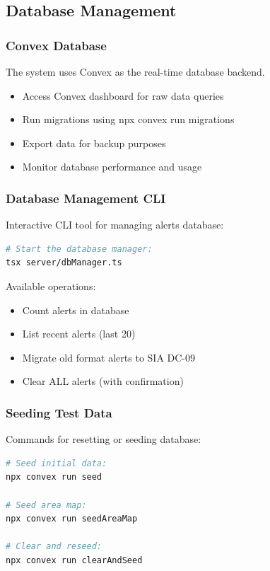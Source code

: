 \documentclass[12pt,a4paper]{article}
\begin{document}
\subsection{Database Management}

\subsubsection{Convex Database}
The system uses Convex as the real-time database backend.
\begin{itemize}
\item Access Convex dashboard for raw data queries
\item Run migrations using npx convex run migrations
\item Export data for backup purposes
\item Monitor database performance and usage
\end{itemize}

\subsubsection{Database Management CLI}
Interactive CLI tool for managing alerts database:

\begin{lstlisting}[language=bash]
# Start the database manager:
tsx server/dbManager.ts
\end{lstlisting}

Available operations:
\begin{itemize}
\item Count alerts in database
\item List recent alerts (last 20)
\item Migrate old format alerts to SIA DC-09
\item Clear ALL alerts (with confirmation)
\end{itemize}

\subsubsection{Seeding Test Data}
Commands for resetting or seeding database:

\begin{lstlisting}[language=bash]
# Seed initial data:
npx convex run seed

# Seed area map:
npx convex run seedAreaMap

# Clear and reseed:
npx convex run clearAndSeed
\end{lstlisting}
\end{document}
